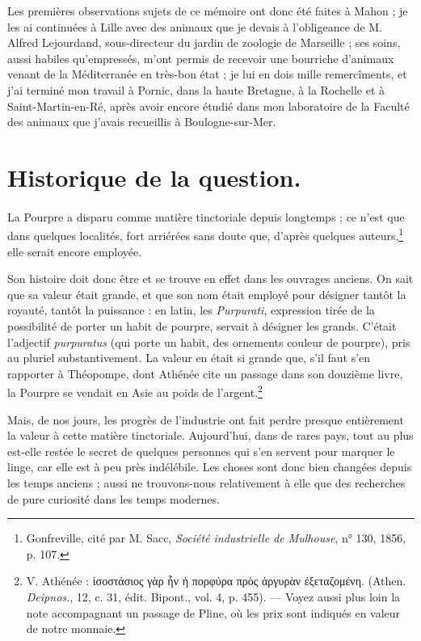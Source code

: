 \documentclass[a4paper, 11pt, oneside, polutonikogreek, french]{article}
\begin{document}
Les premières observations sujets de ce mémoire ont donc été faites à Mahon ; je les ai continuées à Lille avec des animaux que je devais à l'obligeance de M. Alfred Lejourdand, sous-directeur du jardin de zoologie de Marseille ; ses soins, aussi habiles qu'empressés, m'ont permis de recevoir une bourriche d'animaux venant de la Méditerranée en très-bon état ; je lui en dois mille remercîments, et j'ai terminé mon travail à Pornic, dans la haute Bretagne, à la Rochelle et à Saint-Martin-en-Ré, après avoir encore étudié dans mon laboratoire de la Faculté des animaux que j'avais recueillis à Boulogne-sur-Mer.
\clearpage
\section{Historique de la question.}
\paragraph{}
La Pourpre a disparu comme matière tinctoriale depuis longtemps ; ce n'est que dans quelques localités, fort arriérées sans doute que, d'après quelques auteurs,\footnote{Gonfreville, cité par M. Sacc, \emph{Société industrielle de Mulhouse}, n° 130, 1856, p. 107.} elle serait encore employée.

Son histoire doit donc être et se trouve en effet dans les ouvrages anciens. On sait que sa valeur était grande, et que son nom était employé pour désigner tantôt la royauté, tantôt la puissance : en latin, les \emph{Purpurati}, expression tirée de la possibilité de porter un habit de pourpre, servait à désigner les grands. C'était l'adjectif \emph{purpuratus} (qui porte un habit, des ornements couleur de pourpre), pris au pluriel substantivement. La valeur en était si grande que, s'il faut s'en rapporter à Théopompe, dont Athénée cite un passage dans son douzième livre, la Pourpre se vendait en Asie au poids de l'argent.\footnote{V. Athénée : ἰσοστάσιος γὰρ ἧν ἡ πορφύρα πρὸς ἀργυρὰν ἐξεταζομένη. (Athen. \emph{Deipnos.}, 12, c. 31, édit. Bipont., vol. 4, p. 455). --- Voyez aussi plus loin la note accompagnant un passage de Pline, où les prix sont indiqués en valeur de notre monnaie.}

Mais, de nos jours, les progrès de l'industrie ont fait perdre presque entièrement la valeur à cette matière tinctoriale. Aujourd'hui, dans de rares pays, tout au plus est-elle restée le secret de quelques personnes qui s'en servent pour marquer le linge, car elle est à peu près indélébile. Les choses sont donc bien changées depuis les temps anciens ; aussi ne trouvons-nous relativement à elle que des recherches de pure curiosité dans les temps modernes.
\end{document}
